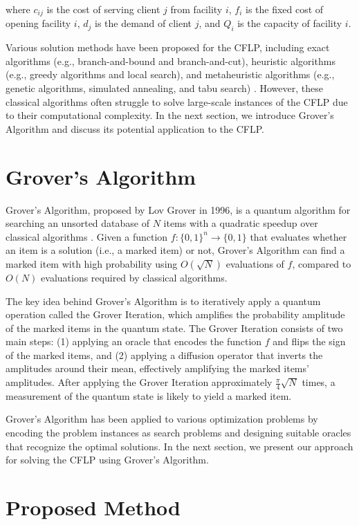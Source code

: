 where $c_{ij}$ is the cost of serving client $j$ from facility $i$, $f_i$ is the fixed cost of opening facility $i$, $d_j$ is the demand of client $j$, and $Q_i$ is the capacity of facility $i$.

Various solution methods have been proposed for the CFLP, including exact algorithms (e.g., branch-and-bound and branch-and-cut), heuristic algorithms (e.g., greedy algorithms and local search), and metaheuristic algorithms (e.g., genetic algorithms, simulated annealing, and tabu search) \cite{farahani2014capacitated}. However, these classical algorithms often struggle to solve large-scale instances of the CFLP due to their computational complexity. In the next section, we introduce Grover's Algorithm and discuss its potential application to the CFLP.

\section{Grover's Algorithm}

Grover's Algorithm, proposed by Lov Grover in 1996, is a quantum algorithm for searching an unsorted database of $N$ items with a quadratic speedup over classical algorithms \cite{grover1996fast}. Given a function $f : \{0,1\}^n \rightarrow \{0,1\}$ that evaluates whether an item is a solution (i.e., a marked item) or not, Grover's Algorithm can find a marked item with high probability using $O(\sqrt{N})$ evaluations of $f$, compared to $O(N)$ evaluations required by classical algorithms.

The key idea behind Grover's Algorithm is to iteratively apply a quantum operation called the Grover Iteration, which amplifies the probability amplitude of the marked items in the quantum state. The Grover Iteration consists of two main steps: (1) applying an oracle that encodes the function $f$ and flips the sign of the marked items, and (2) applying a diffusion operator that inverts the amplitudes around their mean, effectively amplifying the marked items' amplitudes. After applying the Grover Iteration approximately $\frac{\pi}{4}\sqrt{N}$ times, a measurement of the quantum state is likely to yield a marked item.

Grover's Algorithm has been applied to various optimization problems by encoding the problem instances as search problems and designing suitable oracles that recognize the optimal solutions. In the next section, we present our approach for solving the CFLP using Grover's Algorithm.

\section{Proposed Method}

